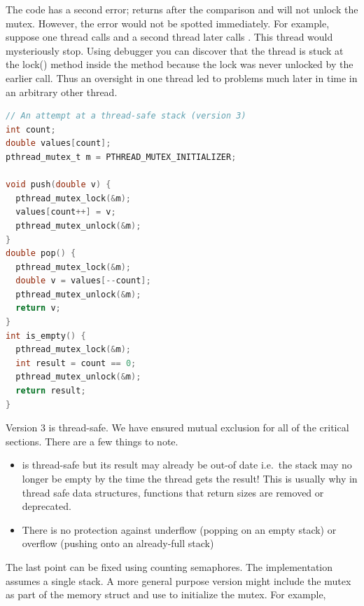 The code has a second error;  returns after the comparison and will not unlock the mutex.
However, the error would not be spotted immediately.
For example, suppose one thread calls  and a second thread later calls .
This thread would mysteriously stop.
Using debugger you can discover that the thread is stuck at the lock() method inside the  method because the lock was never unlocked by the earlier  call.
Thus an oversight in one thread led to problems much later in time in an arbitrary other thread.

\begin{lstlisting}[language=C]
// An attempt at a thread-safe stack (version 3)
int count;
double values[count];
pthread_mutex_t m = PTHREAD_MUTEX_INITIALIZER;

void push(double v) { 
  pthread_mutex_lock(&m); 
  values[count++] = v;
  pthread_mutex_unlock(&m);
}
double pop() {
  pthread_mutex_lock(&m);
  double v = values[--count];
  pthread_mutex_unlock(&m);
  return v;
}
int is_empty() {
  pthread_mutex_lock(&m);
  int result = count == 0;
  pthread_mutex_unlock(&m);
  return result;
}
\end{lstlisting}

Version 3 is thread-safe.
We have ensured mutual exclusion for all of the critical sections.
There are a few things to note.

\begin{itemize}
\item {} is thread-safe but its result may already be out-of date i.e.~the stack may no longer be empty by the time the thread gets the result!
  This is usually why in thread safe data structures, functions that return sizes are removed or deprecated.
  \item There is no protection against underflow (popping on an empty stack) or overflow (pushing onto an already-full stack)
\end{itemize}

The last point can be fixed using counting semaphores. The implementation assumes a single stack. A more general purpose version might include the mutex as part of the memory struct and use  to initialize the mutex. For example,

